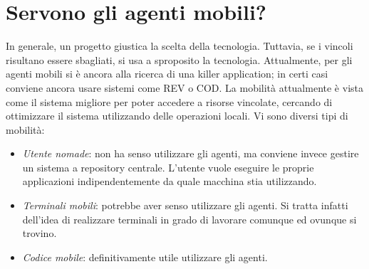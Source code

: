 \section{Servono gli agenti mobili?}
In generale, un progetto giustica la scelta della tecnologia. Tuttavia, se i vincoli risultano essere sbagliati, si usa
a sproposito la tecnologia.
Attualmente, per gli agenti mobili si è ancora alla ricerca di una killer application; in certi casi conviene ancora
usare sistemi come REV o COD. La mobilità attualmente è vista come il sistema migliore per poter accedere a risorse
vincolate, cercando di ottimizzare il sistema utilizzando delle operazioni locali. Vi sono diversi tipi di mobilità:
\begin{itemize}
 \item \textit{Utente nomade}: non ha senso utilizzare gli agenti, ma conviene invece gestire un sistema a repository
centrale.  L'utente vuole eseguire le proprie applicazioni indipendentemente da quale macchina stia utilizzando.
 \item \textit{Terminali mobili}: potrebbe aver senso utilizzare gli agenti. Si tratta infatti dell'idea di realizzare
 terminali in grado di lavorare comunque ed ovunque si trovino.
 \item \textit{Codice mobile}: definitivamente utile utilizzare gli agenti.
\end{itemize}

